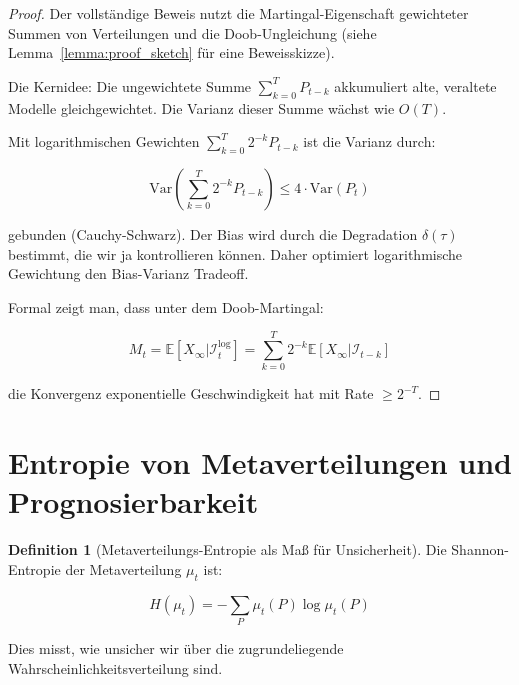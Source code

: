 \documentclass[12pt, a4paper, titlepage]{report}
\theoremstyle{definition}
\newtheorem{definition}[theorem]{Definition}
\theoremstyle{remark}
\newcommand{\E}{\mathbb{E}}
\begin{document}
\begin{proof}
Der vollständige Beweis nutzt die Martingal-Eigenschaft gewichteter Summen von Verteilungen und die Doob-Ungleichung (siehe Lemma~\ref{lemma:proof_sketch} für eine Beweisskizze).

Die Kernidee: Die ungewichtete Summe $\sum_{k=0}^T P_{t-k}$ akkumuliert alte, veraltete Modelle gleichgewichtet. Die Varianz dieser Summe wächst wie $O(T)$.

Mit logarithmischen Gewichten $\sum_{k=0}^T 2^{-k} P_{t-k}$ ist die Varianz durch:

\begin{equation}
\text{Var}\left(\sum_{k=0}^T 2^{-k} P_{t-k}\right) \leq 4 \cdot \text{Var}(P_t)
\end{equation}

gebunden (Cauchy-Schwarz). Der Bias wird durch die Degradation $\delta(\tau)$ bestimmt, die wir ja kontrollieren können. Daher optimiert logarithmische Gewichtung den Bias-Varianz Tradeoff.

Formal zeigt man, dass unter dem Doob-Martingal:

\begin{equation}
M_t = \E[X_\infty | \mathcal{I}_t^{\log}] = \sum_{k=0}^{T} 2^{-k} \E[X_\infty | \mathcal{I}_{t-k}]
\end{equation}

die Konvergenz exponentielle Geschwindigkeit hat mit Rate $\geq 2^{-T}$.
\end{proof}

\section{Entropie von Metaverteilungen und Prognosierbarkeit}

\begin{definition}[Metaverteilungs-Entropie als Maß für Unsicherheit]
Die Shannon-Entropie der Metaverteilung $\mu_t$ ist:

\begin{equation}
H(\mu_t) = -\sum_P \mu_t(P) \log \mu_t(P)
\label{eq:meta_entropy}
\end{equation}

Dies misst, wie unsicher wir über die zugrundeliegende Wahrscheinlichkeitsverteilung sind.
\end{definition}
\end{document}
